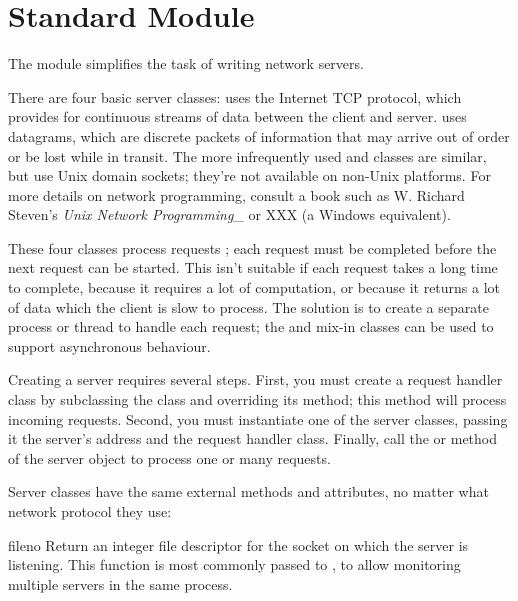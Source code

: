 \section{Standard Module }

The  module simplifies the task of writing network
servers.  

There are four basic server classes:  uses the
Internet TCP protocol, which provides for continuous streams of data
between the client and server.   uses datagrams, which
are discrete packets of information that may arrive out of order or be
lost while in transit.  The more infrequently used
 and  classes are
similar, but use Unix domain sockets; they're not available on
non-Unix platforms.  For more details on network programming, consult
a book such as W. Richard Steven's \emph{Unix Network Programming}_ or
XXX (a Windows equivalent).

These four classes process requests ; each request
must be completed before the next request can be started.  This isn't
suitable if each request takes a long time to complete, because it
requires a lot of computation, or because it returns a lot of data
which the client is slow to process.  The solution is to create a
separate process or thread to handle each request; the
 and  mix-in classes can be
used to support asynchronous behaviour.

Creating a server requires several steps.  First, you must create a
request handler class by subclassing the 
class and overriding its  method; this method will
process incoming requests.  Second, you must instantiate one of the
server classes, passing it the server's address and the request
handler class.  Finally, call the  or
 method of the server object to process one or
many requests.

Server classes have the same external methods and attributes, no
matter what network protocol they use:


\begin{funcdesc}{fileno}{}
Return an integer file descriptor for the socket on which the server
is listening.  This function is most commonly passed to
, to allow monitoring multiple servers in the
same process.
\end{funcdesc}

